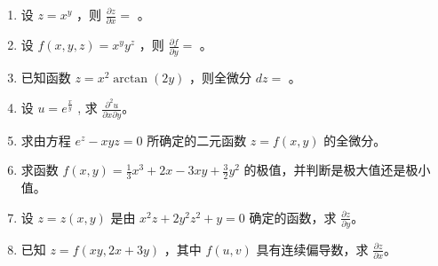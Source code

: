 \documentclass[12pt, a4paper]{article}
\begin{document}
\begin{enumerate}
    \item 设 $ z = x^{y} $ ，则 $ \frac{\partial z}{\partial x} = $ \underline{\hspace{2cm}}。

    \item 设 $ f(x, y, z) = x^{y}y^{z} $ ，则 $ \frac{\partial f}{\partial y} = $ \underline{\hspace{2cm}}。

    \item 已知函数 $ z = x^{2} \arctan(2y) $ ，则全微分 $ dz = $ \underline{\hspace{2cm}}。

    \item 设 $ u = e^{\frac{x}{y}} $ , 求 $ \frac{\partial^{2}u}{\partial x \partial y} $。

    \item 求由方程 $ e^{z}-xyz=0 $ 所确定的二元函数 $ z=f(x,y) $ 的全微分。

    \item 求函数 $ f(x,y)=\frac{1}{3}x^{3}+2x-3xy+\frac{3}{2}y^{2} $ 的极值，并判断是极大值还是极小值。

    \item 设 $ z = z(x, y) $ 是由 $ x^{2}z + 2y^{2}z^{2} + y = 0 $ 确定的函数，求 $ \frac{\partial z}{\partial y} $。

    \item 已知 $ z = f(xy, 2x + 3y) $ ，其中 $ f(u, v) $ 具有连续偏导数，求 $ \frac{\partial z}{\partial x} $。
\end{enumerate}
\end{document}
